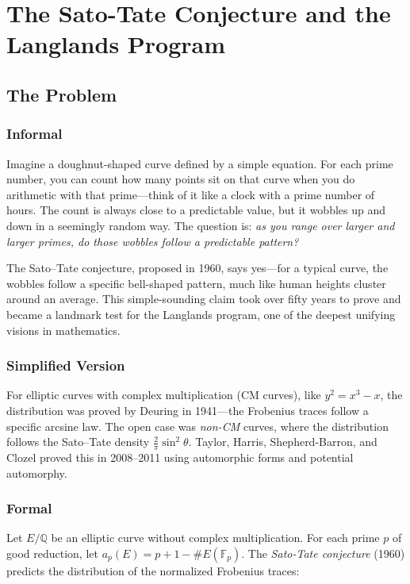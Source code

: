 \let\LocalMacro\relax

\chapter{The Sato-Tate Conjecture and the Langlands Program}

\section{The Problem}

\subsection{Informal}
Imagine a doughnut-shaped curve defined by a simple equation. For each prime number, you can count how many points sit on that curve when you do arithmetic with that prime---think of it like a clock with a prime number of hours. The count is always close to a predictable value, but it wobbles up and down in a seemingly random way. The question is: \emph{as you range over larger and larger primes, do those wobbles follow a predictable pattern?}

The Sato--Tate conjecture, proposed in 1960, says yes---for a typical curve, the wobbles follow a specific bell-shaped pattern, much like human heights cluster around an average. This simple-sounding claim took over fifty years to prove and became a landmark test for the Langlands program, one of the deepest unifying visions in mathematics.

\subsection{Simplified Version}
For elliptic curves with complex multiplication (CM curves), like $y^2 = x^3 - x$, the distribution was proved by Deuring in 1941---the Frobenius traces follow a specific arcsine law. The open case was \emph{non-CM} curves, where the distribution follows the Sato--Tate density $\frac{2}{\pi}\sin^2\theta$. Taylor, Harris, Shepherd-Barron, and Clozel proved this in 2008--2011 using automorphic forms and potential automorphy.

\subsection{Formal}
Let $E/\mathbb{Q}$ be an elliptic curve without complex multiplication. For each prime $p$ of good reduction, let $a_p(E) = p + 1 - \#E(\mathbb{F}_p)$. The \emph{Sato-Tate conjecture} (1960) predicts the distribution of the normalized Frobenius traces:

